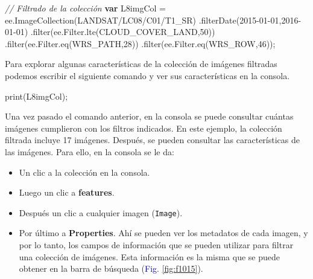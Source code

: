 \documentclass[
  12pt,
  letterpaper,
  twoside]{book}
\newenvironment{Shaded}{\begin{snugshade}}{\end{snugshade}}
\newcommand{\AttributeTok}[1]{\textcolor[rgb]{0.48,0.12,0.64}{#1}}
\newcommand{\CommentTok}[1]{\textcolor[rgb]{0.24,0.58,0.00}{\textit{#1}}}
\newcommand{\DecValTok}[1]{\textcolor[rgb]{0.28,0.53,0.93}{#1}}
\newcommand{\FunctionTok}[1]{\textcolor[rgb]{0.48,0.12,0.64}{#1}}
\newcommand{\KeywordTok}[1]{\textcolor[rgb]{0.00,0.00,0.00}{\textbf{#1}}}
\newcommand{\NormalTok}[1]{#1}
\newcommand{\OperatorTok}[1]{\textcolor[rgb]{0.00,0.00,0.00}{#1}}
\newcommand{\StringTok}[1]{\textcolor[rgb]{0.87,0.29,0.22}{#1}}
\providecommand{\tightlist}{%
  \setlength{\itemsep}{0pt}\setlength{\parskip}{0pt}}
\begin{document}
\begin{Shaded}
\begin{Highlighting}[]
\CommentTok{// Filtrado de la colección}
\KeywordTok{var}\NormalTok{ L8imgCol }\OperatorTok{=}\NormalTok{ ee}\OperatorTok{.}\FunctionTok{ImageCollection}\NormalTok{(}\StringTok{\textquotesingle{}LANDSAT/LC08/C01/T1\_SR\textquotesingle{}}\NormalTok{)}
  \OperatorTok{.}\FunctionTok{filterDate}\NormalTok{(}\StringTok{\textquotesingle{}2015{-}01{-}01\textquotesingle{}}\OperatorTok{,}\StringTok{\textquotesingle{}2016{-}01{-}01\textquotesingle{}}\NormalTok{)}
  \OperatorTok{.}\FunctionTok{filter}\NormalTok{(ee}\OperatorTok{.}\AttributeTok{Filter}\OperatorTok{.}\FunctionTok{lte}\NormalTok{(}\StringTok{\textquotesingle{}CLOUD\_COVER\_LAND\textquotesingle{}}\OperatorTok{,}\DecValTok{50}\NormalTok{))}
  \OperatorTok{.}\FunctionTok{filter}\NormalTok{(ee}\OperatorTok{.}\AttributeTok{Filter}\OperatorTok{.}\FunctionTok{eq}\NormalTok{(}\StringTok{\textquotesingle{}WRS\_PATH\textquotesingle{}}\OperatorTok{,}\DecValTok{28}\NormalTok{))}
  \OperatorTok{.}\FunctionTok{filter}\NormalTok{(ee}\OperatorTok{.}\AttributeTok{Filter}\OperatorTok{.}\FunctionTok{eq}\NormalTok{(}\StringTok{\textquotesingle{}WRS\_ROW\textquotesingle{}}\OperatorTok{,}\DecValTok{46}\NormalTok{))}\OperatorTok{;}
\end{Highlighting}
\end{Shaded}

Para explorar algunas características de la colección de imágenes filtradas podemos escribir el siguiente comando y ver sus características en la consola.

\begin{Shaded}
\begin{Highlighting}[]
\FunctionTok{print}\NormalTok{(L8imgCol)}\OperatorTok{;}
\end{Highlighting}
\end{Shaded}

Una vez pasado el comando anterior, en la consola se puede consultar cuántas imágenes cumplieron con los filtros indicados. En este ejemplo, la colección filtrada incluye 17 imágenes. Después, se pueden consultar las características de las imágenes. Para ello, en la consola se le da:

\begin{itemize}
\tightlist
\item
  Un clic a la colección en la consola.
\item
  Luego un clic a \textbf{features}.
\item
  Después un clic a cualquier imagen (\texttt{Image}).
\item
  Por último a \textbf{Properties}. Ahí se pueden ver los metadatos de cada imagen, y por lo tanto, los campos de información que se pueden utilizar para filtrar una colección de imágenes. Esta información es la misma que se puede obtener en la barra de búsqueda (\textcolor{darkblue}{Fig.} \ref{fig:f1015}).
\end{itemize}
\end{document}
